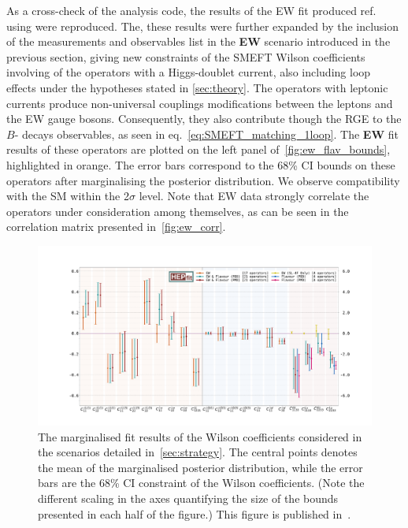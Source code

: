 As a cross-check of the analysis code, the results of the EW fit produced ref.~\cite{Efrati:2015eaa} using \HEPfit were reproduced. 
The, these results were further expanded by the inclusion of the measurements and observables list in the {\bf EW} scenario introduced in the previous section, giving new constraints of the SMEFT Wilson coefficients involving of the operators with a Higgs-doublet current, also including loop effects under the hypotheses stated in \autoref{sec:theory}. The operators with leptonic currents produce non-universal couplings modifications between the leptons and the EW gauge bosons. Consequently, they also contribute though the RGE to the $B$- decays observables, as seen in eq.~\eqref{eq:SMEFT_matching_1loop}. The {\bf EW} fit results of these operators are plotted on the left panel of~\autoref{fig:ew_flav_bounds}, highlighted in orange. The error bars correspond to the 68\% CI bounds on these operators after marginalising the posterior distribution.  We observe compatibility with the SM within the 2$\sigma$ level. Note that EW data strongly correlate the operators under consideration among themselves, as can be seen in the correlation matrix presented in~\autoref{fig:ew_corr}.\\
\newpage
\begin{figure}
	\centering
	\includegraphics[width=\textwidth]{figures/errorbar.pdf}
	\caption{
		The marginalised fit results of the Wilson coefficients considered in the scenarios detailed in~\autoref{sec:strategy}. The central points denotes the mean of the marginalised posterior distribution, while the error bars are the 68\% CI constraint of the Wilson coefficients.  (Note the different scaling in the axes quantifying the size of the bounds presented in each half of the figure.) This figure is published in~\cite{Alasfar:2020mne}. 
	}
	\label{fig:ew_flav_bounds}
\end{figure}
